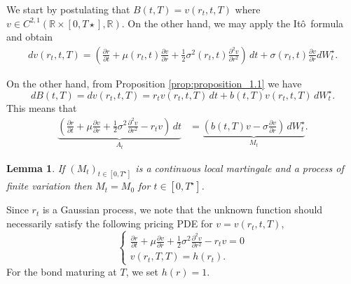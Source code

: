 \documentclass[10pt, oneside, reqno]{amsbook}
\theoremstyle{plain}%
\newtheorem{lem}[thm]{Lemma}
\theoremstyle{definition}
\theoremstyle{rem}
\theoremstyle{definition}
\newcommand{\R}{\mathbb{R}}
\newcommand{\ito}{It\^o\ }
\numberwithin{equation}{chapter}
\begin{document}
We start by postulating that $B(t, T) = v(r_t, t, T)$ where $v \in C^{2,1}(\R \times [0, T\star], \R)$.  On the other hand, we may apply the \ito formula and obtain \begin{align*}
    dv(r_t, t, T) = \left( \frac{\partial r}{\partial t} + \mu(r_t, t) \frac{\partial v}{\partial r} + \frac{1}{2} \sigma^2(r_t, t) \frac{\partial^2 v}{\partial r^2} \right) \, dt + \sigma(r_t, t) \frac{\partial v}{\partial r} dW^\star_t.
\end{align*} 

 On the other hand, from Proposition \ref{prop:proposition_1.1} we have \[
    dB(t, T) = dv(r_t, t, T) = r_t v(r_t, t, T) \, dt + b(t, T)v(r_t, t, T) \, dW^\star_t.
 \]  This means that \begin{align*}
    \underbrace{\left( \frac{\partial r}{\partial t} + \mu \frac{\partial v}{\partial r} + \frac{1}{2} \sigma^2 \frac{\partial^2 v}{\partial r^2} - r_t v \right) \, dt}_{A_t} &= \underbrace{\left( b(t, T) v - \sigma \frac{\partial v}{\partial r} \right) \, dW^\star_t}_{M_t}.
 \end{align*}

\begin{lem}
    If $(M_t)_{t \in [0, T^\star]}$ is a continuous local martingale and a process of finite variation then $M_t = M_0$ for $t \in [0, T^\star]$.
\end{lem}

Since $r_t$ is a Gaussian process, we note that the unknown function should necessarily satisfy the following pricing PDE for $v = v(r_t, t, T)$, \[
    \begin{cases}
         \frac{\partial r}{\partial t} + \mu \frac{\partial v}{\partial r} + \frac{1}{2} \sigma^2 \frac{\partial^2 v}{\partial r^2} - r_t v = 0 \\
        v(r_t, T, T) = h(r_t).
    \end{cases}
\] For the bond maturing at $T$, we set $h(r) = 1$.
\end{document}
